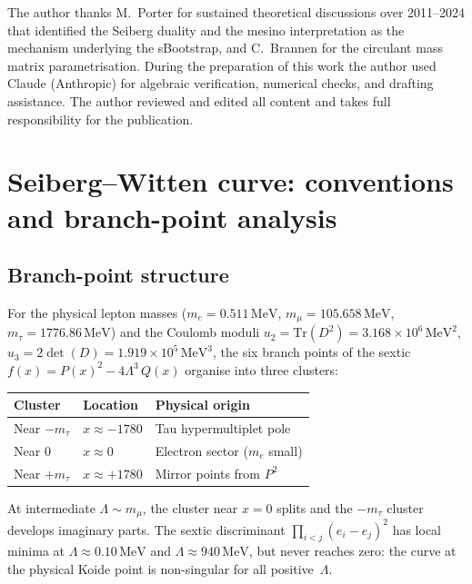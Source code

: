 \documentclass[aps,prd,twocolumn,showpacs,preprintnumbers,superscriptaddress,floatfix]{revtex4-2}
\newcommand{\Tr}{\mathrm{Tr}}
\newcommand{\MeV}{\,\mathrm{MeV}}
\begin{document}
\begin{acknowledgments}
The author thanks M.~Porter for sustained theoretical discussions
over 2011--2024 that identified the Seiberg duality and the mesino
interpretation as the mechanism underlying the sBootstrap,
and C.~Brannen for the circulant mass matrix parametrisation.
During the preparation of this work the author used Claude
(Anthropic) for algebraic verification, numerical checks,
and drafting assistance.
The author reviewed and edited all content and takes full
responsibility for the publication.
\end{acknowledgments}


\appendix

\section{Seiberg--Witten curve: conventions and branch-point analysis}
\label{app:SW}

\subsection{Branch-point structure}

For the physical lepton masses
($m_e = 0.511\MeV$, $m_\mu = 105.658\MeV$,
$m_\tau = 1776.86\MeV$) and the Coulomb moduli
$u_2 = \Tr(D^2) = 3.168 \times 10^6\MeV^2$,
$u_3 = 2\det(D) = 1.919 \times 10^5\MeV^3$,
the six branch points of the sextic
$f(x) = P(x)^2 - 4\Lambda^3\,Q(x)$ organise into three clusters:

\begin{center}
\small
\begin{tabular}{lll}
\toprule
Cluster & Location & Physical origin \\
\midrule
Near $-m_\tau$ & $x \approx -1780$ & Tau hypermultiplet pole \\
Near $0$ & $x \approx 0$ & Electron sector ($m_e$ small) \\
Near $+m_\tau$ & $x \approx +1780$ & Mirror points from $P^2$ \\
\bottomrule
\end{tabular}
\end{center}

At intermediate $\Lambda \sim m_\mu$, the cluster near $x = 0$
splits and the $-m_\tau$ cluster develops imaginary parts.
The sextic discriminant $\prod_{i<j}(e_i - e_j)^2$ has local
minima at $\Lambda \approx 0.10\MeV$ and $\Lambda \approx 940\MeV$,
but never reaches zero: the curve at the physical Koide point is
non-singular for all positive~$\Lambda$.
\end{document}
